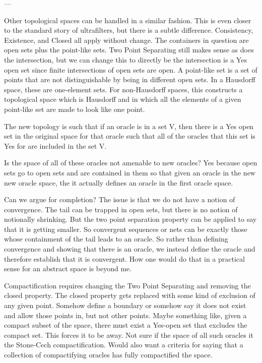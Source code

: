 \documentclass[12pt]{article}
\begin{document}
---

Other topological spaces can be handled in a similar fashion. This is even closer to the standard story of ultrafilters, but there is a subtle difference. Consistency, Existence, and Closed all apply without change. The containers in question are open sets plus the point-like sets. Two Point Separating still makes sense as does the intersection, but we can change this to directly be the intersection is a Yes open set since finite intersections of open sets are open.  A point-like set is a set of points that are not distinguishable by being in different open sets. In a Hausdorff space, these are one-element sets. For non-Hausdorff spaces, this constructs a topological space which is Hausdorff and in which all the elements of a given point-like set are made to look like one point. 

The new topology is such that if an oracle is in a set V, then there is a Yes open set in the original space for that oracle such that all of the oracles that this set is Yes for are included in the set V. 

Is the space of all of these oracles not amenable to new oracles? Yes because open sets go to open sets and are contained in them so that given an oracle in the new new oracle space, the it actually defines an oracle in the first oracle space. 

Can we argue for completion? The issue is that we do not have a notion of convergence. The tail can be trapped in open sets, but there is no notion of notionally shrinking. But the two point separation property can be applied to say that it is getting smaller. So convergent sequences or nets can be exactly those whose containment of the tail leads to an oracle. So rather than defining convergence and showing that there is an oracle, we instead define the oracle and therefore establish that it is convergent. How one would do that in a practical sense for an abstract space is beyond me. 

Compactification requires changing the Two Point Separating and removing the closed property. The closed property gets replaced with some kind of exclusion of any given point. Somehow define a boundary or somehow say it does not exist and allow those points in, but not other points. Maybe something like, given a compact subset of the space, there must exist a Yes-open set that excludes the compact set. This forces it to be away. Not sure if the space of all such oracles it the Stone-Cech compactification. Would also want a criteria for saying that a collection of compactifying oracles has fully compactified the space. 
\end{document}
